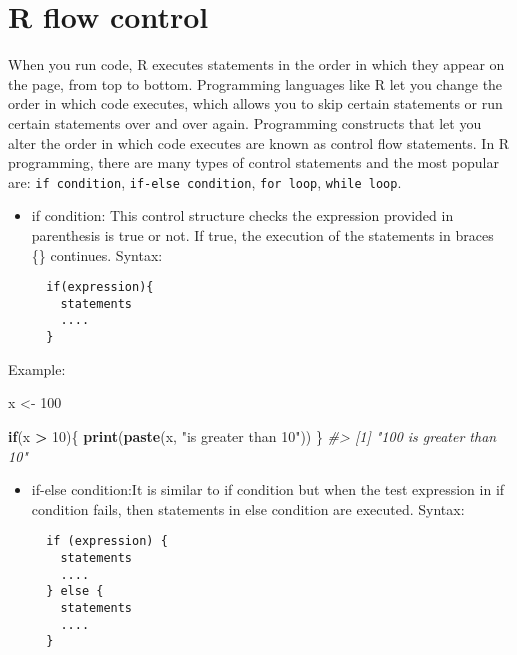 \documentclass[
]{book}
\newenvironment{Shaded}{\begin{snugshade}}{\end{snugshade}}
\newcommand{\CommentTok}[1]{\textcolor[rgb]{0.56,0.35,0.01}{\textit{#1}}}
\newcommand{\ControlFlowTok}[1]{\textcolor[rgb]{0.13,0.29,0.53}{\textbf{#1}}}
\newcommand{\DecValTok}[1]{\textcolor[rgb]{0.00,0.00,0.81}{#1}}
\newcommand{\FunctionTok}[1]{\textcolor[rgb]{0.13,0.29,0.53}{\textbf{#1}}}
\newcommand{\NormalTok}[1]{#1}
\newcommand{\OtherTok}[1]{\textcolor[rgb]{0.56,0.35,0.01}{#1}}
\newcommand{\SpecialCharTok}[1]{\textcolor[rgb]{0.81,0.36,0.00}{\textbf{#1}}}
\newcommand{\StringTok}[1]{\textcolor[rgb]{0.31,0.60,0.02}{#1}}
\begin{document}
\hypertarget{r-flow-control}{%
\section{R flow control}\label{r-flow-control}}

When you run code, R executes statements in the order in which they appear on the page, from top to bottom. Programming languages like R let you change the order in which code executes, which allows you to skip certain statements or run certain statements over and over again. Programming constructs that let you alter the order in which code executes are known as control flow statements. In R programming, there are many types of control statements and the most popular are: \texttt{if\ condition}, \texttt{if-else\ condition}, \texttt{for\ loop}, \texttt{while\ loop}.

\begin{itemize}
\item
  if condition: This control structure checks the expression provided in parenthesis is true or not. If true, the execution of the statements in braces \{\} continues.
  Syntax:

\begin{verbatim}
  if(expression){
    statements
    ....
  }
\end{verbatim}
\end{itemize}

Example:

\begin{Shaded}
\begin{Highlighting}[]
\NormalTok{x }\OtherTok{\textless{}{-}} \DecValTok{100}

\ControlFlowTok{if}\NormalTok{(x }\SpecialCharTok{\textgreater{}} \DecValTok{10}\NormalTok{)\{ }
  \FunctionTok{print}\NormalTok{(}\FunctionTok{paste}\NormalTok{(x, }\StringTok{"is greater than 10"}\NormalTok{))}
\NormalTok{\}}
\CommentTok{\#\textgreater{} [1] "100 is greater than 10"}
\end{Highlighting}
\end{Shaded}

\begin{itemize}
\item
  if-else condition:It is similar to if condition but when the test expression in if condition fails, then statements in else condition are executed.
  Syntax:

\begin{verbatim}
  if (expression) {
    statements
    ....
  } else {
    statements
    ....
  }
\end{verbatim}
\end{itemize}
\end{document}
